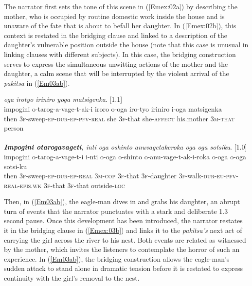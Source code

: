 \documentclass[output=paper]{LSP/langsci}
\begin{document}
The narrator first sets the tone of this scene in (\ref{Emex:02a}) by describing the mother, who is occupied by routine domestic work inside the house and is unaware of the fate that is about to befall her daughter. In (\ref{Emex:02b}), this context is restated in the bridging clause and linked to a description of the daughter’s vulnerable position outside the house (note that this case is unusual in linking clauses with different subjects). In this case, the bridging construction serves to express the simultaneous unwitting actions of the mother and the daughter, a calm scene that will be interrupted by the violent arrival of the \textit{pakitsa} in (\ref{Em03ab}).
\pagebreak

\begin{exe}
\ex \label{Em02ab}
\begin{xlist}
\ex \label{Emex:02a}
\glt \textit{\underline{} oga irotyo iriniro yoga matsigenka}. [1.1]\\
\gll impogini o-tarog-a-vage-t-ak-i iroro o-oga iro-tyo iriniro i-oga matsigenka\\
 then \textsc{3f}-sweep\textsc{-ep-dur-ep-pfv-real} she \textsc{3f-}that she\textsc{-affect} his.mother \textsc{3m-that} person\\
\glt {}\\
\ex \label{Emex:02b}
\glt \textit{\textbf{Impogini otarogavageti}, inti oga oshinto anuvagetakeroka oga oga sotsiku}. [1.0]\\
\gll impogini o-tarog-a-vage-t-i i-nti o-oga o-shinto o-anu-vage-t-ak-i-roka o-oga o-oga sotsi-ku\\     	      
   then \textsc{3f-}sweep\textsc{-ep-dur-ep-real} \textsc{3m-cop} \textsc{3f-}that \textsc{3f-}daughter \textsc{3f-}walk\textsc{-dur-eu-pfv-real-epis.wk} \textsc{3f-}that \textsc{3f-}that outside\textsc{-loc}\\
\glt {}
\end{xlist}
\end{exe}


Then, in (\ref{Em03ab}), the eagle-man dives in and grabs his daughter, an abrupt turn of events that the narrator punctuates with a stark and deliberate 1.3 second pause. Once this development has been introduced, the narrator restates it in the bridging clause in (\ref{Emex:03b}) and links it to the \textit{pakitsa’s} next act of carrying the girl across the river to his nest. Both events are related as witnessed by the mother, which invites the listeners to contemplate the horror of such an experience. In (\ref{Em03ab}), the bridging construction allows the eagle-man’s sudden attack to stand alone in dramatic tension before it is restated to express continuity with the girl’s removal to the nest. 
\end{document}
